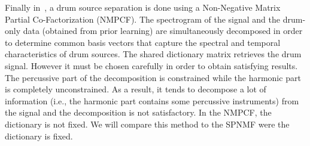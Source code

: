 Finally in~\cite{kim2011nonnegative}, a drum source separation is done using a Non-Negative Matrix Partial Co-Factorization (NMPCF). The spectrogram of the signal and the drum-only data (obtained from prior learning) are simultaneously decomposed in order to determine common basis vectors that capture the spectral and temporal characteristics of drum sources. The shared dictionary matrix retrieves the drum signal. However it must be chosen carefully in order to obtain satisfying results. The percussive part of the decomposition is constrained while the harmonic part is completely unconstrained. As a result, it tends to decompose a lot of information (i.e., the harmonic part contains some percussive instruments) from the signal and the decomposition is not satisfactory. In the NMPCF, the dictionary is not fixed. We will compare this method to the SPNMF were the dictionary is fixed. 
